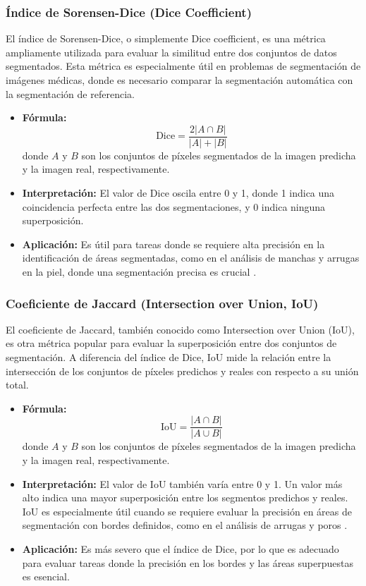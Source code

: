\subsubsection{Índice de Sorensen-Dice (Dice Coefficient)}  
El índice de Sorensen-Dice, o simplemente Dice coefficient, es una métrica ampliamente utilizada para evaluar la similitud entre dos conjuntos de datos segmentados. Esta métrica es especialmente útil en problemas de segmentación de imágenes médicas, donde es necesario comparar la segmentación automática con la segmentación de referencia.  
\begin{itemize}
    \item \textbf{Fórmula:}  
    \[
    \text{Dice} = \frac{2|A \cap B|}{|A| + |B|}
    \]
    donde \( A \) y \( B \) son los conjuntos de píxeles segmentados de la imagen predicha y la imagen real, respectivamente.
    \item \textbf{Interpretación:} El valor de Dice oscila entre 0 y 1, donde 1 indica una coincidencia perfecta entre las dos segmentaciones, y 0 indica ninguna superposición.
    \item \textbf{Aplicación:} Es útil para tareas donde se requiere alta precisión en la identificación de áreas segmentadas, como en el análisis de manchas y arrugas en la piel, donde una segmentación precisa es crucial \parencite{autor2020dice}.
\end{itemize}

\subsubsection{Coeficiente de Jaccard (Intersection over Union, IoU)}  
El coeficiente de Jaccard, también conocido como \( \text{Intersection over Union} \) (IoU), es otra métrica popular para evaluar la superposición entre dos conjuntos de segmentación. A diferencia del índice de Dice, IoU mide la relación entre la intersección de los conjuntos de píxeles predichos y reales con respecto a su unión total.  
\begin{itemize}
    \item \textbf{Fórmula:}  
    \[
    \text{IoU} = \frac{|A \cap B|}{|A \cup B|}
    \]
    donde \( A \) y \( B \) son los conjuntos de píxeles segmentados de la imagen predicha y la imagen real, respectivamente.
    \item \textbf{Interpretación:} El valor de IoU también varía entre 0 y 1. Un valor más alto indica una mayor superposición entre los segmentos predichos y reales. IoU es especialmente útil cuando se requiere evaluar la precisión en áreas de segmentación con bordes definidos, como en el análisis de arrugas y poros \parencite{autor2021iou}.
    \item \textbf{Aplicación:} Es más severo que el índice de Dice, por lo que es adecuado para evaluar tareas donde la precisión en los bordes y las áreas superpuestas es esencial.
\end{itemize}

